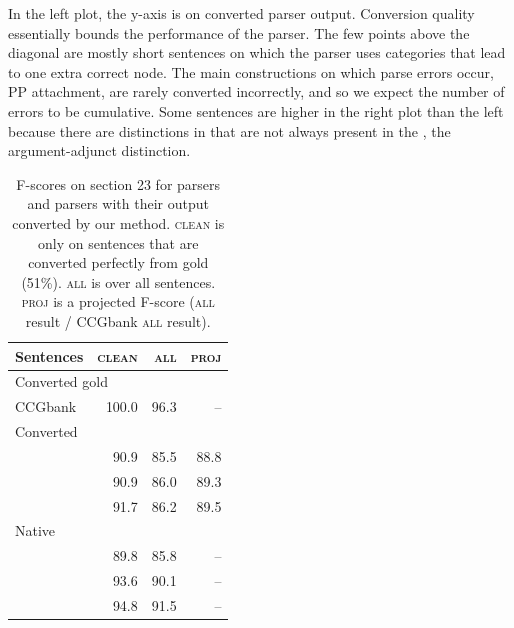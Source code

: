 In the left plot, the y-axis is \parseval on converted \candc parser output.
Conversion quality essentially bounds the performance of the parser.  The few
points above the diagonal are mostly short sentences on which the \candc parser
uses categories that lead to one extra correct node.
The main constructions on which parse errors occur, \myeg PP attachment, are
rarely converted incorrectly, and so we expect the number of errors to be
cumulative.  Some sentences are higher in the right plot than the left because
there are distinctions in \ccg that are not always present in the \ptb, \myeg the
argument-adjunct distinction.

\begin{table}
\renewcommand{\tabcolsep}{1.8mm}
\small
\begin{center}
\begin{tabular}{lrr|r}
	\hline
	Sentences & \textsc{clean} & \textsc{all} & \textsc{proj} \\
	\hline
	\hline
		\multicolumn{2}{l}{Converted gold \ccg} & & \\
		CCGbank & \hspace{0mm}100.0 & \hspace{0mm}96.3 & -- \\
	\hline
		\multicolumn{2}{l}{Converted \ccg} & & \\
		\textcite{Clark-Curran:2007} & 90.9 & 85.5 & 88.8 \\
		\textcite{Fowler-Penn:2010} & 90.9 & 86.0 & 89.3 \\
		\textcite{Auli-Lopez:2011} & 91.7 & 86.2 & 89.5 \\
	\hline
		\multicolumn{2}{l}{Native \ptb} & & \\
		\textcite{Klein-Manning:2003} & 89.8 & 85.8 & -- \\
		\textcite{Petrov-Klein:2007} & 93.6 & 90.1 & -- \\
		\textcite{Charniak-Johnson:2005} & 94.8 & 91.5 & -- \\
	\hline
\end{tabular}
\vspace{-3.0mm}
\caption{
	\label{tab:full-comp}
	F-scores on section 23 for \ptb parsers and \ccg parsers with their output
	converted by our method.
	\textsc{clean} is only on sentences that are converted perfectly from gold
	\ccg (51\%).
	\textsc{all} is over all sentences.  
	\textsc{proj} is a projected F-score (\textsc{all} result / CCGbank
	\textsc{all} result).
}
\end{center}
\vspace{-6mm}
\end{table}

